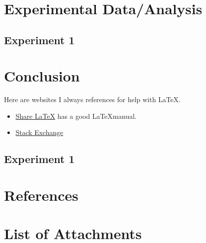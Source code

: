 \documentclass[a4paper]{article}
\begin{document}
\section{Experimental Data/Analysis}
\subsection{Experiment 1}
\lipsum[1] %
\section{Conclusion}
Here are websites I always references for help with \LaTeX. 
\begin{itemize}
\item \href{http://www.sharelatex.com}{Share LaTeX} has a good \LaTeX manual.
\item  \href{https://tex.stackexchange.com/}{Stack Exchange}
\end{itemize}

\subsection{Experiment 1}
\lipsum[1]
\section{References}
\section{List of Attachments}
\listoffigures
\listoftables
\end{document}
